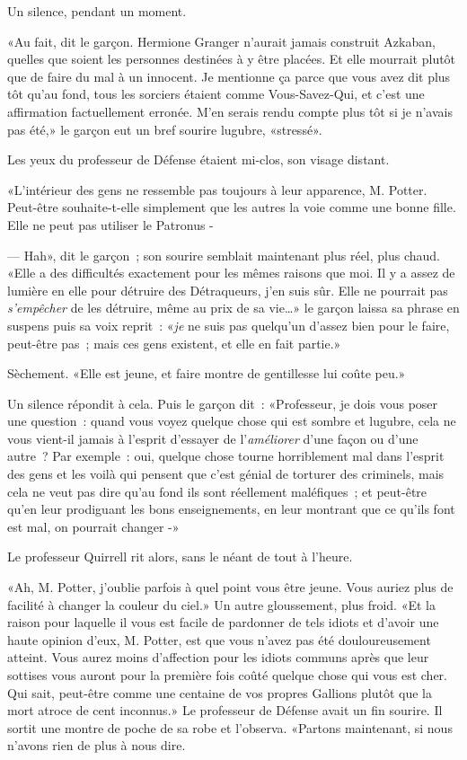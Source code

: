 Un silence, pendant un moment.

«Au fait, dit le garçon. Hermione Granger n'aurait jamais construit Azkaban, quelles que soient les personnes destinées à y être placées. Et elle mourrait plutôt que de faire du mal à un innocent. Je mentionne ça parce que vous avez dit plus tôt qu'au fond, tous les sorciers étaient comme Vous-Savez-Qui, et c'est une affirmation factuellement erronée. M'en serais rendu compte plus tôt si je n'avais pas été,» le garçon eut un bref sourire lugubre, «stressé».

Les yeux du professeur de Défense étaient mi-clos, son visage distant.

«L'intérieur des gens ne ressemble pas toujours à leur apparence, M. Potter. Peut-être souhaite-t-elle simplement que les autres la voie comme une bonne fille. Elle ne peut pas utiliser le Patronus -

--- Hah», dit le garçon~; son sourire semblait maintenant plus réel, plus chaud. «Elle a des difficultés exactement pour les mêmes raisons que moi. Il y a assez de lumière en elle pour détruire des Détraqueurs, j'en suis sûr. Elle ne pourrait pas \emph{s'empêcher} de les détruire, même au prix de sa vie…» le garçon laissa sa phrase en suspens puis sa voix reprit~: «\emph{je} ne suis pas quelqu'un d'assez bien pour le faire, peut-être pas~; mais ces gens existent, et elle en fait partie.»

Sèchement. «Elle est jeune, et faire montre de gentillesse lui coûte peu.»

Un silence répondit à cela. Puis le garçon dit~: «Professeur, je dois vous poser une question~: quand vous voyez quelque chose qui est sombre et lugubre, cela ne vous vient-il jamais à l'esprit d'essayer de l'\emph{améliorer} d'une façon ou d'une autre~? Par exemple~: oui, quelque chose tourne horriblement mal dans l'esprit des gens et les voilà qui pensent que c'est génial de torturer des criminels, mais cela ne veut pas dire qu'au fond ils sont réellement maléfiques~; et peut-être qu'en leur prodiguant les bons enseignements, en leur montrant que ce qu'ils font est mal, on pourrait changer -»

Le professeur Quirrell rit alors, sans le néant de tout à l'heure.

«Ah, M. Potter, j'oublie parfois à quel point vous être jeune. Vous auriez plus de facilité à changer la couleur du ciel.» Un autre gloussement, plus froid. «Et la raison pour laquelle il vous est facile de pardonner de tels idiots et d'avoir une haute opinion d'eux, M. Potter, est que vous n'avez pas été douloureusement atteint. Vous aurez moins d'affection pour les idiots communs après que leur sottises vous auront pour la première fois coûté quelque chose qui vous est cher. Qui sait, peut-être comme une centaine de vos propres Gallions plutôt que la mort atroce de cent inconnus.» Le professeur de Défense avait un fin sourire. Il sortit une montre de poche de sa robe et l'observa. «Partons maintenant, si nous n'avons rien de plus à nous dire.

